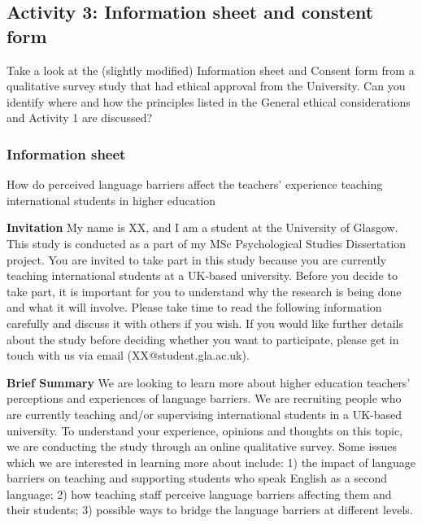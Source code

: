 \documentclass[
  english,
  letterpaper,
  DIV=11,
  numbers=noendperiod]{scrreprt}
\begin{document}
\subsection{Activity 3: Information sheet and constent
form}\label{activity-3-information-sheet-and-constent-form}

Take a look at the (slightly modified) Information sheet and Consent
form from a qualitative survey study that had ethical approval from the
University. Can you identify where and how the principles listed in the
General ethical considerations and Activity 1 are discussed?

\subsubsection{Information sheet}\label{information-sheet}

How do perceived language barriers affect the teachers' experience
teaching international students in higher education

\textbf{Invitation} My name is XX, and I am a student at the University
of Glasgow. This study is conducted as a part of my MSc Psychological
Studies Dissertation project. You are invited to take part in this study
because you are currently teaching international students at a UK-based
university. Before you decide to take part, it is important for you to
understand why the research is being done and what it will involve.
Please take time to read the following information carefully and discuss
it with others if you wish. If you would like further details about the
study before deciding whether you want to participate, please get in
touch with us via email (XX@student.gla.ac.uk).

\textbf{Brief Summary} We are looking to learn more about higher
education teachers' perceptions and experiences of language barriers. We
are recruiting people who are currently teaching and/or supervising
international students in a UK-based university. To understand your
experience, opinions and thoughts on this topic, we are conducting the
study through an online qualitative survey. Some issues which we are
interested in learning more about include: 1) the impact of language
barriers on teaching and supporting students who speak English as a
second language; 2) how teaching staff perceive language barriers
affecting them and their students; 3) possible ways to bridge the
language barriers at different levels.
\end{document}
